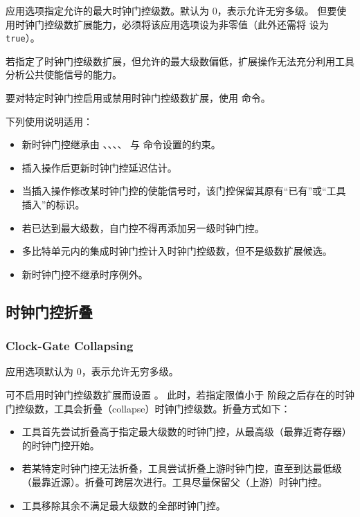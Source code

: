  应用选项指定允许的最大时钟门控级数。默认为 0，表示允许无穷多级。
但要使用时钟门控级数扩展能力，必须将该应用选项设为非零值（此外还需将  设为 \texttt{true}）。

若指定了时钟门控级数扩展，但允许的最大级数偏低，扩展操作无法充分利用工具分析公共使能信号的能力。

要对特定时钟门控启用或禁用时钟门控级数扩展，使用  命令。

下列使用说明适用：
\begin{itemize}
  \item 新时钟门控继承由 、、、、 与  命令设置的约束。
  \item 插入操作后更新时钟门控延迟估计。
  \item 当插入操作修改某时钟门控的使能信号时，该门控保留其原有“已有”或“工具插入”的标识。
  \item 若已达到最大级数，自门控不得再添加另一级时钟门控。
  \item 多比特单元内的集成时钟门控计入时钟门控级数，但不是级数扩展候选。
  \item 新时钟门控不继承时序例外。
\end{itemize}

\subsection{时钟门控折叠}
\subsubsection*{Clock-Gate Collapsing}

 应用选项默认为 0，表示允许无穷多级。

可不启用时钟门控级数扩展而设置 。
此时，若指定限值小于  阶段之后存在的时钟门控级数，工具会折叠（collapse）时钟门控级数。折叠方式如下：
\begin{itemize}
  \item 工具首先尝试折叠高于指定最大级数的时钟门控，从最高级（最靠近寄存器）的时钟门控开始。
  \item 若某特定时钟门控无法折叠，工具尝试折叠上游时钟门控，直至到达最低级（最靠近源）。折叠可跨层次进行。工具尽量保留父（上游）时钟门控。
  \item 工具移除其余不满足最大级数的全部时钟门控。
\end{itemize}

